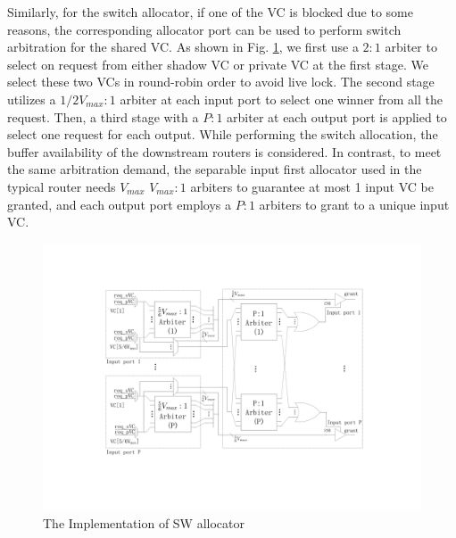 \documentclass[10pt,conference]{IEEEtran}
\begin{document}
Similarly, for the switch allocator, if one of the VC is blocked due to some reasons, the corresponding allocator port can be used to perform switch arbitration for the shared VC. As shown in Fig. \ref{swallocator}, we first use a $2:1$ arbiter to select on request from either shadow VC or private VC at the first stage. We select these two VCs in round-robin order to avoid live lock. The second stage utilizes a $1/2V_{max}:1$ arbiter at each input port to select one winner from all the request. Then, a third stage with a $P:1$ arbiter at each output port is applied to select one request for each output. While performing the switch allocation, the buffer availability of the downstream routers is considered. In contrast, to meet the same arbitration demand, the separable input first allocator used in the typical router needs $V_{max}$ $V_{max}:1$ arbiters to guarantee at most 1 input VC be granted, and each output port employs a $P:1$ arbiters to grant to a unique input VC.

\begin{figure}
\centering\includegraphics[scale=0.3]{figures/swalloc.pdf}
\caption{The Implementation of SW allocator}\label{swallocator}
\end{figure}
\end{document}
